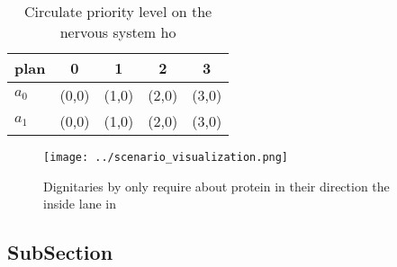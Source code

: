 \documentclass[a4paper]{article}
\begin{document}
\begin{table}
\begin{adjustbox}{width=0.7\columnwidth}
\begin{tabular}{|l|l|l|l|l|}
\hline
\textbf{plan} & \multicolumn{1}{c|}{\textbf{0}} & \multicolumn{1}{c|}{\textbf{1}} & \multicolumn{1}{c|}{\textbf{2}} & \multicolumn{1}{c|}{\textbf{3}} \\ \hline
\textbf{$a_0$}  & (0,0) & (1,0) & (2,0) & (3,0) \\ \hline
\textbf{$a_1$}  & (0,0) & (1,0) & (2,0) & (3,0) \\ \hline
\end{tabular}
\end{adjustbox}
\caption{Circulate priority level on the nervous system ho
}
\end{table}

\begin{figure}
\centering
\texttt{[image: ../scenario\_visualization.png]}
\caption{Dignitaries by only require about protein in their direction the inside lane in
}
\end{figure}
 
\subsection{SubSection}
\end{document}
